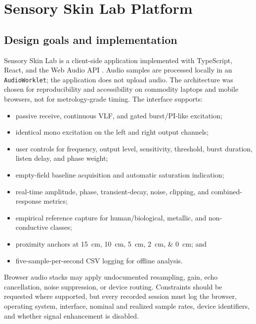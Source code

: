 \documentclass[10pt]{article}
\begin{document}
\section{Sensory Skin Lab Platform}
\subsection{Design goals and implementation}
Sensory Skin Lab is a client-side application implemented with TypeScript, React, and the Web Audio API \citep{sensoryskin2026software}. Audio samples are processed locally in an \texttt{AudioWorklet}; the application does not upload audio. The architecture was chosen for reproducibility and accessibility on commodity laptops and mobile browsers, not for metrology-grade timing. The interface supports:
\begin{itemize}
  \item passive receive, continuous VLF, and gated burst/PI-like excitation;
  \item identical mono excitation on the left and right output channels;
  \item user controls for frequency, output level, sensitivity, threshold, burst duration, listen delay, and phase weight;
  \item empty-field baseline acquisition and automatic saturation indication;
  \item real-time amplitude, phase, transient-decay, noise, clipping, and combined-response metrics;
  \item empirical reference capture for human/biological, metallic, and non-conductive classes;
  \item proximity anchors at \SIlist{15;10;5;2;0}{\centi\metre}; and
  \item five-sample-per-second CSV logging for offline analysis.
\end{itemize}

Browser audio stacks may apply undocumented resampling, gain, echo cancellation, noise suppression, or device routing. Constraints should be requested where supported, but every recorded session must log the browser, operating system, interface, nominal and realized sample rates, device identifiers, and whether signal enhancement is disabled.
\end{document}
